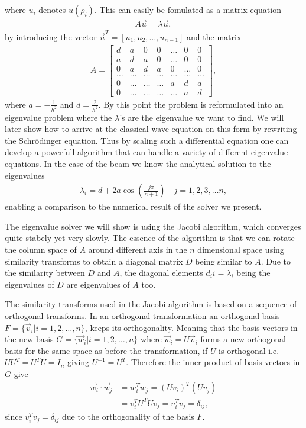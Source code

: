 \documentclass[twocolumn]{aastex62}
\begin{document}
where $u_i$ denotes $u(\rho_i)$. This can easily be fomulated as a matrix equation 
\begin{align}
	A\vec{u} = \lambda\vec{u},
	\label{eq:matrix_eq}
\end{align}
by introducing the vector $\vec{u}^T = [u_1, u_2, \ldots, u_{n-1}]$ and the matrix
\begin{align}
A = 
	\begin{bmatrix} 
	d& a & 0   & 0    & \dots  &0     & 0 \\
    a & d & a & 0    & \dots  &0     &0 \\
    0   & a & d & a  &0       &\dots & 0\\
    \dots  & \dots & \dots & \dots  &\dots      &\dots & \dots\\
    0   & \dots & \dots & \dots  &a  &d & a\\
   0   & \dots & \dots & \dots  &\dots       &a & d
    \end{bmatrix} ,
\end{align}
where $a = -\frac{1}{h^2}$ and $d = \frac{2}{h^2}$.
By this point the problem is reformulated into an eigenvalue problem where the $\lambda$'s are the eigenvalue we want to find. 
We will later show how to arrive at the classical wave equation on this form by rewriting the Schrödinger equation. Thus by scaling such a differential equation one can develop a powerfull algorithm that can handle a variety of different eigenvalue equations. In the case of the beam we know the analytical solution to the eigenvalues 
\begin{align}\label{eq:analyticaleig}
	\lambda_i = d + 2a \cos\left(\frac{j\pi}{n+1}\right)\quad j = 1, 2, 3, \ldots n,
\end{align}
enabling a comparison to the numerical result of the solver we present. 

The eigenvalue solver we will show is using the Jacobi algorithm, which converges quite stabely yet very slowly. The essence of the algorithm is that we can rotate the column space of $A$ around different axis in the $n$ dimensional space using similarity transforms to obtain a diagonal matrix $D$ being similar to $A$. Due to the similarity between $D$ and $A$, the diagonal elements $d_ii = \lambda_i$ being the eigenvalues of $D$ are eigenvalues of $A$ too.

The similarity transforms used in the Jacobi algorithm is based on a sequence of orthogonal transforms. In an orthogonal transformation an orthogonal basis $F = \{\vec{v}_i | i = 1, 2, \ldots, n\}$, keeps its orthogonality. Meaning that the basis vectors in the new basis $G = \{\vec{w}_i | i = 1, 2, \ldots, n\}$ where $\vec{w}_i = U\vec{v}_i$ forms a new orthogonal basis for the same space as before the transformation, if $U$ is orthogonal i.e. $UU^T = U^TU = I_n$ giving $U^{-1} = U^T$. Therefore the inner product of basis vectors in $G$ give 
\begin{align}
	\vec{w}_i\cdot \vec{w}_j &= w_i^Tw_j = (Uv_i)^T(Uv_j) \\
	&= v_i^TU^TUv_j = v_i^Tv_j = \delta_{ij},
\end{align}
since $v_i^Tv_j = \delta_{ij}$ due to the orthogonality of the basis $F$.
\end{document}
